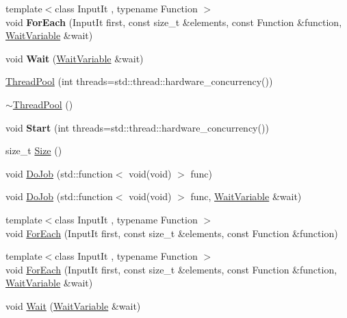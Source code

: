 \begin{DoxyCompactItemize}
\item 
\hypertarget{classatl_1_1_thread_pool_a16ebafa211b0c60aa56fc839a646a758}{{\footnotesize template$<$class Input\+It , typename Function $>$ }\\void {\bfseries For\+Each} (Input\+It first, const size\+\_\+t \&elements, const Function \&function, \hyperlink{classatl_1_1_wait_variable}{Wait\+Variable} \&wait)}\label{classatl_1_1_thread_pool_a16ebafa211b0c60aa56fc839a646a758}

\item 
\hypertarget{classatl_1_1_thread_pool_a59f8f9c30945196c845ee26c1d1dfd10}{void {\bfseries Wait} (\hyperlink{classatl_1_1_wait_variable}{Wait\+Variable} \&wait)}\label{classatl_1_1_thread_pool_a59f8f9c30945196c845ee26c1d1dfd10}

\item 
\hyperlink{classatl_1_1_thread_pool_a02ca8a74131b65469a77d09637971865}{Thread\+Pool} (int threads=std\+::thread\+::hardware\+\_\+concurrency())
\item 
\hyperlink{classatl_1_1_thread_pool_a487944b9f55c77a0d74ebc9f129e1ad3}{$\sim$\+Thread\+Pool} ()
\item 
\hypertarget{classatl_1_1_thread_pool_a96599097f0e7ac0665b16ea23cd5d014}{void {\bfseries Start} (int threads=std\+::thread\+::hardware\+\_\+concurrency())}\label{classatl_1_1_thread_pool_a96599097f0e7ac0665b16ea23cd5d014}

\item 
size\+\_\+t \hyperlink{classatl_1_1_thread_pool_afaaedabb66c24d2dffadad1a17ee326e}{Size} ()
\item 
void \hyperlink{classatl_1_1_thread_pool_a98a69f6bc963f87dcde08db1f30a24c8}{Do\+Job} (std\+::function$<$ void(void) $>$ func)
\item 
void \hyperlink{classatl_1_1_thread_pool_ab11df304a64fb8d887f4fe2ef7fc66f9}{Do\+Job} (std\+::function$<$ void(void) $>$ func, \hyperlink{classatl_1_1_wait_variable}{Wait\+Variable} \&wait)
\item 
{\footnotesize template$<$class Input\+It , typename Function $>$ }\\void \hyperlink{classatl_1_1_thread_pool_a6096504a6d4a74ec14ca8235ab9615b5}{For\+Each} (Input\+It first, const size\+\_\+t \&elements, const Function \&function)
\item 
{\footnotesize template$<$class Input\+It , typename Function $>$ }\\void \hyperlink{classatl_1_1_thread_pool_a16ebafa211b0c60aa56fc839a646a758}{For\+Each} (Input\+It first, const size\+\_\+t \&elements, const Function \&function, \hyperlink{classatl_1_1_wait_variable}{Wait\+Variable} \&wait)
\item 
void \hyperlink{classatl_1_1_thread_pool_a59f8f9c30945196c845ee26c1d1dfd10}{Wait} (\hyperlink{classatl_1_1_wait_variable}{Wait\+Variable} \&wait)
\end{DoxyCompactItemize}
